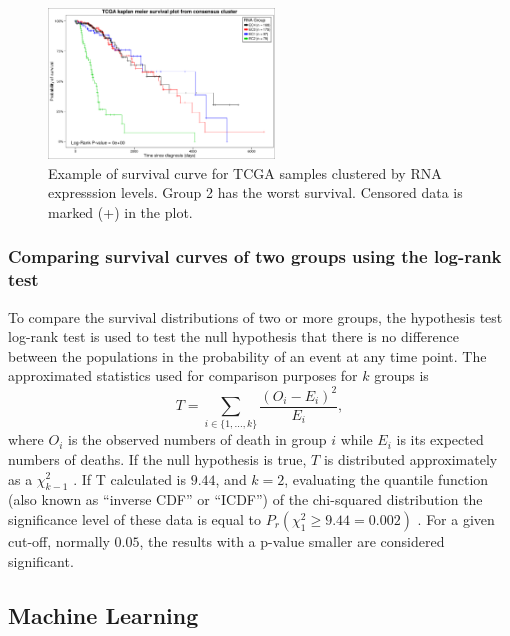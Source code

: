\begin{figure}
\includegraphics[width=0.5\linewidth,height=4cm]{images/example_survival.png}
\caption[Example of survival curve.]{\label{fig:survival_example}
Example of survival curve for TCGA samples clustered by RNA expresssion levels. Group 2 has
the worst survival. Censored data is marked (+) in the plot.}
\end{figure}




\subsubsection{Comparing survival curves of two groups using the log-rank test}

 To compare the survival distributions of two or more groups,  the hypothesis test log-rank test is
 used to test the null hypothesis that there is no difference between the populations
 in the probability of an event at any time point.
%
 The approximated statistics used for comparison purposes for $k$ groups is
 $$T = \sum_{i \in \{1,\ldots,k\}}\frac{(O_i - E_i)^2}{E_i},$$
 where $O_i$ is the observed numbers of death in  group $i$
 while $E_i$ is its expected numbers of deaths.
 If the null hypothesis is true, $T$ is distributed approximately as a $\chi^2_{k-1}$ \cite{matthews1996using}.
If T calculated is $9.44$, and $k = 2$,  evaluating the quantile function (also known as “inverse CDF” or “ICDF”) of the chi-squared distribution the significance level of these data is equal to
$P_r(\chi^2_{1}\geq9.44 = 0.002)$ \cite{yau2012r}.
For a given cut-off, normally $0.05$, the results with a p-value smaller are considered significant.

\subsection{Machine Learning}

